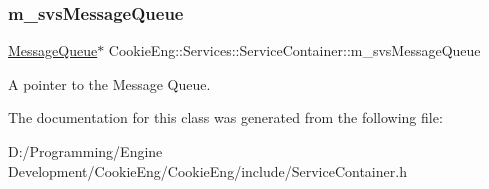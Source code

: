 \subsubsection{\texorpdfstring{m\+\_\+svs\+Message\+Queue}{m\_svsMessageQueue}}
{\footnotesize\ttfamily \hyperlink{class_cookie_eng_1_1_services_1_1_message_queue}{Message\+Queue}$\ast$ Cookie\+Eng\+::\+Services\+::\+Service\+Container\+::m\+\_\+svs\+Message\+Queue\hspace{0.3cm}{\ttfamily [protected]}}

A pointer to the Message Queue. 

The documentation for this class was generated from the following file\+:\begin{DoxyCompactItemize}
\item 
D\+:/\+Programming/\+Engine Development/\+Cookie\+Eng/\+Cookie\+Eng/include/Service\+Container.\+h\end{DoxyCompactItemize}
